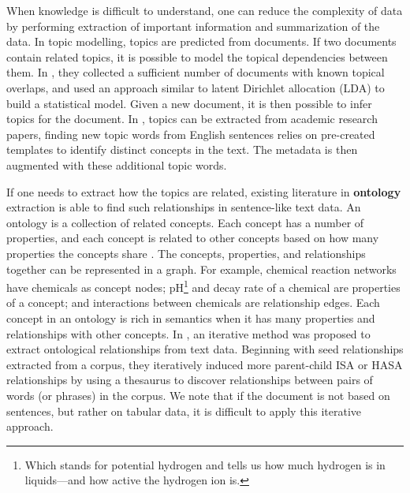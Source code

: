 When knowledge is difficult to understand, one can reduce the complexity of data by performing extraction of important information and summarization of the data. In topic modelling, topics are predicted from documents. If two documents contain related topics, it is possible to model the topical dependencies between them. In \cite{Zolaktaf2012Modeling}, they collected a sufficient number of documents with known topical overlaps, and used an approach similar to latent Dirichlet allocation (LDA) to build a statistical model. Given a new document, it is then possible to infer topics for the document. In \cite{Nargesian2018Table}, topics can be extracted from academic research papers, finding new topic words from English sentences relies on pre-created templates to identify distinct concepts in the text. The metadata is then augmented with these additional topic words.

If one needs to extract how the topics are related, existing literature in \textbf{\gls{ontology}} extraction is able to find such relationships in sentence-like text data. An ontology is a collection of related concepts. Each concept has a number of properties, and each concept is related to other concepts based on how many properties the concepts share \cite{cruz2005role}. The concepts, properties, and relationships together can be represented in a graph. For example, chemical reaction networks have chemicals as concept nodes; pH\footnote{Which stands for potential hydrogen and tells us how much hydrogen is in liquids—and how active the hydrogen ion is.} and decay rate of a chemical are properties of a concept; and interactions between chemicals are relationship edges. Each concept in an ontology is rich in semantics when it has many properties and relationships with other concepts. In \cite{10.1145/2396761.2398468}, an iterative method was proposed to extract ontological relationships from text data. Beginning with seed relationships extracted from a corpus, they iteratively induced more parent-child ISA or HASA relationships by using a thesaurus to discover relationships between pairs of words (or phrases) in the corpus. We note that if the document is not based on sentences, but rather on tabular data, it is difficult to apply this iterative approach.

